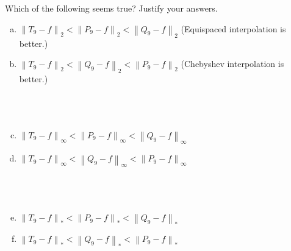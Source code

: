 \documentclass[12pt]{article}
\newcommand{\norm}[1]{\left\lVert#1\right\rVert}
\begin{document}
\pagebreak
Which of the following seems true? Justify your answers.
\begin{enumerate}[(a)]
	\item $\norm{T_9-f}_2 < \norm{P_9-f}_2 < \norm{Q_9-f}_2$ (Equispaced interpolation is better.)
	\item $\norm{T_9-f}_2 < \norm{Q_9-f}_2 < \norm{P_9-f}_2$ (Chebyshev interpolation is better.)\\\\\\\\
	
	\item $\norm{T_9-f}_\infty < \norm{P_9-f}_\infty < \norm{Q_9-f}_\infty$ 
	\item $\norm{T_9-f}_\infty < \norm{Q_9-f}_\infty < \norm{P_9-f}_\infty$ \\\\\\\\
	
	\item $\norm{T_9-f}_* < \norm{P_9-f}_* < \norm{Q_9-f}_*$ 
	\item $\norm{T_9-f}_* < \norm{Q_9-f}_* < \norm{P_9-f}_*$ \\\\\\\\
\end{enumerate}
\end{document}
